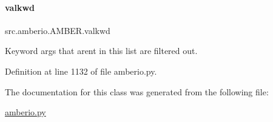 \paragraph{\texorpdfstring{valkwd}{valkwd}}
{\footnotesize\ttfamily src.\+amberio.\+A\+M\+B\+E\+R.\+valkwd}



Keyword args that aren\textquotesingle{}t in this list are filtered out. 



Definition at line 1132 of file amberio.\+py.



The documentation for this class was generated from the following file\+:\begin{DoxyCompactItemize}
\item 
\hyperlink{amberio_8py}{amberio.\+py}\end{DoxyCompactItemize}
